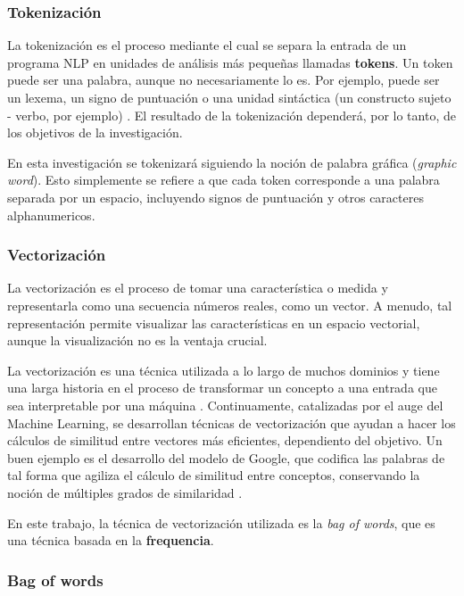 \documentclass[12pt,letterpaper,twoside]{article}
\begin{document}
\subsubsection{Tokenización}
\label{sec:orgde0d315}
La tokenización es el proceso mediante el cual se separa la entrada
de un programa NLP en unidades de análisis más pequeñas llamadas
\textbf{tokens}. Un token puede ser una palabra, aunque no necesariamente
lo es. Por ejemplo, puede ser un lexema, un signo de puntuación
o una unidad sintáctica (un constructo sujeto - verbo, por ejemplo)
\cite{manning1999foundations}. El resultado de la tokenización
dependerá, por lo tanto, de los objetivos de la investigación.

En esta investigación se tokenizará siguiendo la noción de
palabra gráfica (\emph{graphic word}). Esto simplemente se refiere
a que cada token corresponde a una palabra separada por un espacio,
incluyendo signos de puntuación y otros caracteres alphanumericos.




\subsubsection{Vectorización}
\label{sec:orgcf526e5}
La vectorización es el proceso de tomar una característica o medida
y representarla como una secuencia números reales, como un vector. A menudo,
tal representación permite visualizar las características en un espacio
vectorial, aunque la visualización no es la ventaja crucial.

La vectorización es una técnica utilizada a lo largo de muchos
dominios y tiene una larga historia en el proceso de transformar
un concepto a una entrada que sea interpretable por una máquina
\cite{jha_abhishek_vectorization}.  Continuamente, catalizadas por
el auge del Machine Learning, se desarrollan técnicas de
vectorización que ayudan a hacer los cálculos de similitud entre
vectores más eficientes, dependiento del objetivo. Un buen
ejemplo es el desarrollo del modelo de Google, que
codifica las palabras de tal forma que agiliza el cálculo
de similitud entre conceptos, conservando la noción
de múltiples grados de similaridad \cite{mikolov2013efficient}.

En este trabajo, la técnica de vectorización utilizada es
la \emph{bag of words}, que es una técnica basada en la \textbf{frequencia}.

\subsubsection{Bag of words}
\label{sec:orgb63851a}
\end{document}
